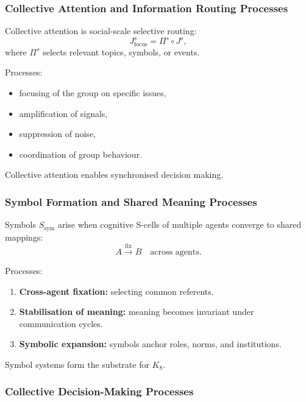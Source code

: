 \subsubsection{Collective Attention and Information Routing Processes}

Collective attention is social-scale selective routing:
\[
J^s_{\text{focus}} = \Pi^s \circ J^s,
\]
where $\Pi^s$ selects relevant topics, symbols, or events.

Processes:
\begin{itemize}
    \item focusing of the group on specific issues,
    \item amplification of signals,
    \item suppression of noise,
    \item coordination of group behaviour.
\end{itemize}

Collective attention enables synchronised decision making.

\subsubsection{Symbol Formation and Shared Meaning Processes}

Symbols $S_{\text{sym}}$ arise when cognitive S-cells of multiple
agents converge to shared mappings:
\[
A \xrightarrow{\text{fix}} B
\quad \text{across agents}.
\]

Processes:
\begin{enumerate}
    \item \textbf{Cross-agent fixation:}
    selecting common referents.
    \item \textbf{Stabilisation of meaning:}
    meaning becomes invariant under communication cycles.
    \item \textbf{Symbolic expansion:}
    symbols anchor roles, norms, and institutions.
\end{enumerate}

Symbol systems form the substrate for $K_8$.

\subsubsection{Collective Decision-Making Processes}

